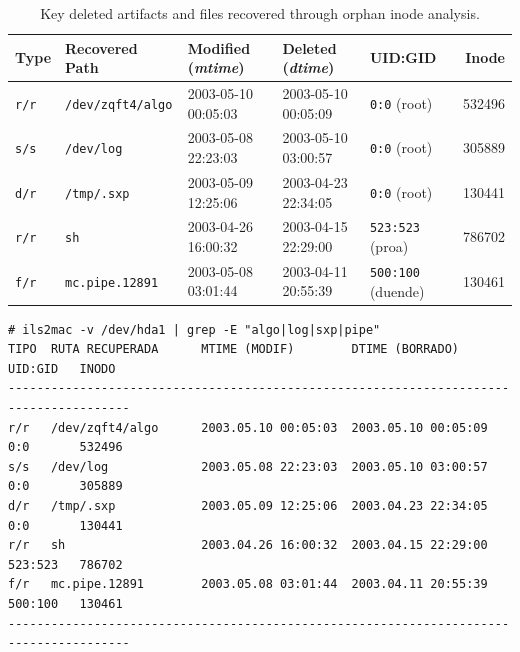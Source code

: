 \begin{table}[htbp]
\centering
\scriptsize
\begin{tabularx}{\textwidth}{@{} l >{\raggedright\arraybackslash}X l l l r @{}}
\toprule
\textbf{Type} & \textbf{Recovered Path} & \textbf{Modified (\textit{mtime})} & \textbf{Deleted (\textit{dtime})} & \textbf{UID:GID} & \textbf{Inode} \\
\midrule
\texttt{r/r} & \texttt{/dev/zqft4/algo}    & 2003-05-10 00:05:03 & 2003-05-10 00:05:09 & \texttt{0:0} (root)      & 532496 \\
\texttt{s/s} & \texttt{/dev/log}           & 2003-05-08 22:23:03 & 2003-05-10 03:00:57 & \texttt{0:0} (root)      & 305889 \\
\texttt{d/r} & \texttt{/tmp/.sxp}          & 2003-05-09 12:25:06 & 2003-04-23 22:34:05 & \texttt{0:0} (root)      & 130441 \\
\texttt{r/r} & \texttt{sh}                 & 2003-04-26 16:00:32 & 2003-04-15 22:29:00 & \texttt{523:523} (proa)  & 786702 \\
\texttt{f/r} & \texttt{mc.pipe.12891}      & 2003-05-08 03:01:44 & 2003-04-11 20:55:39 & \texttt{500:100} (duende)& 130461 \\
\bottomrule
\end{tabularx}
\caption{Key deleted artifacts and files recovered through orphan inode analysis.}
\label{tab:archivos_recuperados}
\end{table}

\noindent
\begin{minipage}{\linewidth}
\begin{lstlisting}[style=terminal]
# ils2mac -v /dev/hda1 | grep -E "algo|log|sxp|pipe"
TIPO  RUTA RECUPERADA      MTIME (MODIF)        DTIME (BORRADO)      UID:GID   INODO
---------------------------------------------------------------------------------------
r/r   /dev/zqft4/algo      2003.05.10 00:05:03  2003.05.10 00:05:09  0:0       532496
s/s   /dev/log             2003.05.08 22:23:03  2003.05.10 03:00:57  0:0       305889
d/r   /tmp/.sxp            2003.05.09 12:25:06  2003.04.23 22:34:05  0:0       130441
r/r   sh                   2003.04.26 16:00:32  2003.04.15 22:29:00  523:523   786702
f/r   mc.pipe.12891        2003.05.08 03:01:44  2003.04.11 20:55:39  500:100   130461
---------------------------------------------------------------------------------------
\end{lstlisting}
\end{minipage}

\vspace{1em}

